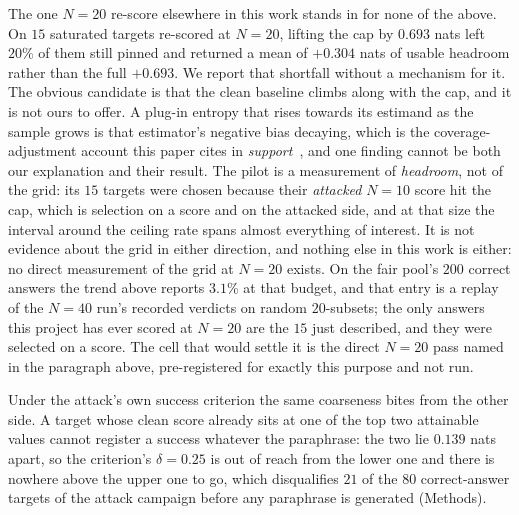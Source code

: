 The one $N{=}20$ re-score elsewhere in this work stands in for none of the above. On $15$
saturated targets re-scored at $N{=}20$, lifting the cap by $0.693$ nats
left $20\%$ of them still pinned and returned a mean of $+0.304$ nats of usable headroom
rather than the full $+0.693$. We report that shortfall without a mechanism for it. The
obvious candidate is that the clean baseline climbs along with the cap, and it is not ours to
offer. A plug-in entropy that rises towards its estimand as the sample grows is that
estimator's negative bias decaying, which is the coverage-adjustment account this paper
cites in \emph{support}~\citep{mccabe2025alphabet, pan2026shade}, and one finding cannot be
both our explanation and their result. The pilot is
a measurement of \emph{headroom}, not of the grid: its $15$ targets were chosen because their
\emph{attacked} $N{=}10$ score hit the cap, which is selection on a score and on the attacked
side, and at that size the interval around the ceiling rate spans almost everything of
interest. It is not evidence about the grid in either direction, and nothing else in this
work is either: no direct measurement of the grid at $N{=}20$ exists. On the fair pool's
$200$ correct answers the trend above reports $3.1\%$ at that budget, and that entry is a
replay of the $N{=}40$ run's recorded verdicts on random $20$-subsets; the only answers this
project has ever scored at $N{=}20$ are the $15$ just described, and they were selected on a
score. The cell that would settle it is the direct $N{=}20$ pass named in the paragraph
above, pre-registered for exactly this purpose and not run.

Under the attack's own success criterion the same coarseness bites from the other side. A
target whose clean score already sits at one of the top two attainable values cannot register
a success whatever the paraphrase: the two lie $0.139$ nats apart, so the criterion's
$\delta{=}0.25$ is out of reach from the lower one and there is nowhere above the upper one
to go, which disqualifies $21$ of the $80$ correct-answer targets of the attack campaign
before any paraphrase is generated (Methods).

